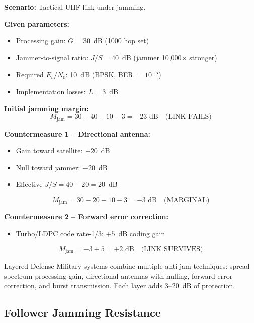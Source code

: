 \textbf{Scenario:} Tactical UHF link under jamming.

\textbf{Given parameters:}
\begin{itemize}
\item Processing gain: $G = 30$~dB (1000 hop set)
\item Jammer-to-signal ratio: $J/S = 40$~dB (jammer 10,000$\times$ stronger)
\item Required $E_b/N_0$: 10~dB (BPSK, BER $= 10^{-5}$)
\item Implementation losses: $L = 3$~dB
\end{itemize}

\textbf{Initial jamming margin:}
\begin{equation}
M_{\text{jam}} = 30 - 40 - 10 - 3 = -23 \text{ dB} \quad \text{(LINK FAILS)}
\end{equation}

\textbf{Countermeasure 1 -- Directional antenna:}
\begin{itemize}
\item Gain toward satellite: $+20$~dB
\item Null toward jammer: $-20$~dB
\item Effective $J/S = 40 - 20 = 20$~dB
\end{itemize}
\begin{equation}
M_{\text{jam}} = 30 - 20 - 10 - 3 = -3 \text{ dB} \quad \text{(MARGINAL)}
\end{equation}

\textbf{Countermeasure 2 -- Forward error correction:}
\begin{itemize}
\item Turbo/LDPC code rate-1/3: $+5$~dB coding gain
\end{itemize}
\begin{equation}
M_{\text{jam}} = -3 + 5 = +2 \text{ dB} \quad \text{(LINK SURVIVES)}
\end{equation}

\begin{calloutbox}{Layered Defense}
Military systems combine multiple anti-jam techniques: spread spectrum processing gain, directional antennas with nulling, forward error correction, and burst transmission. Each layer adds 3--20~dB of protection.
\end{calloutbox}

\subsection{Follower Jamming Resistance}

